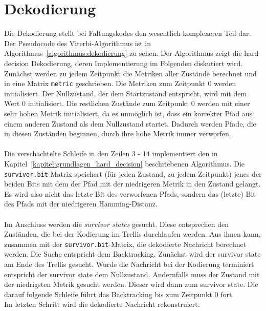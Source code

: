 \section{Dekodierung}
\label{kapitel:implementierung_dekodierung}
Die Dekodierung stellt bei Faltungskodes den wesentlich komplexeren Teil dar. Der Pseudocode des Viterbi-Algorithmus ist in Algorithmus~\ref{algorithmus:dekodierung} zu sehen. Der Algorithmus zeigt die hard decision Dekodierung, deren Implementierung im Folgenden diskutiert wird. Zunächst werden zu jedem Zeitpunkt die Metriken aller Zustände berechnet und in eine Matrix \texttt{metric} geschrieben. Die Metriken zum Zeitpunkt 0 werden initialisiert. Der Nullzustand, der dem Startzustand entspricht, wird mit dem Wert 0 initialisiert. Die restlichen Zustände zum Zeitpunkt 0 werden mit einer sehr hohen Metrik initialisiert, da es unmöglich ist, dass ein korrekter Pfad aus einem anderen Zustand als dem Nullzustand startet. Dadurch werden Pfade, die in diesen Zuständen beginnen, durch ihre hohe Metrik immer verworfen. 
\\
\\
Die verschachtelte Schleife in den Zeilen 3 - 14 implementiert den in Kapitel~\ref{kapitel:grundlagen_hard_decision} beschriebenen Algorithmus. Die \texttt{survivor.bit}-Matrix speichert (für jeden Zustand, zu jedem Zeitpunkt) jenes der beiden Bits mit dem der Pfad mit der niedrigeren Metrik in den Zustand gelangt. Es wird also nicht das letzte Bit des verworfenen Pfads, sondern das (letzte) Bit des Pfads mit der niedrigeren Hamming-Distanz.
\\
\\
Im Anschluss werden die \emph{survivor states} gesucht. Diese entsprechen den Zuständen, die bei der Kodierung im Trellis durchlaufen werden. Aus ihnen kann, zusammen mit der \texttt{survivor.bit}-Matrix, die dekodierte Nachricht berechnet werden. Die Suche entspricht dem Backtracking. Zunächst wird der survivor state am Ende des Trellis gesucht. Wurde die Nachricht bei der Kodierung terminiert entspricht der survivor state dem Nullzustand. Andernfalls muss der Zustand mit der niedrigsten Metrik gesucht werden. Dieser wird dann zum survivor state. Die darauf folgende Schleife führt das Backtracking bis zum Zeitpunkt 0 fort.
\\
Im letzten Schritt wird die dekodierte Nachricht rekonstruiert.

